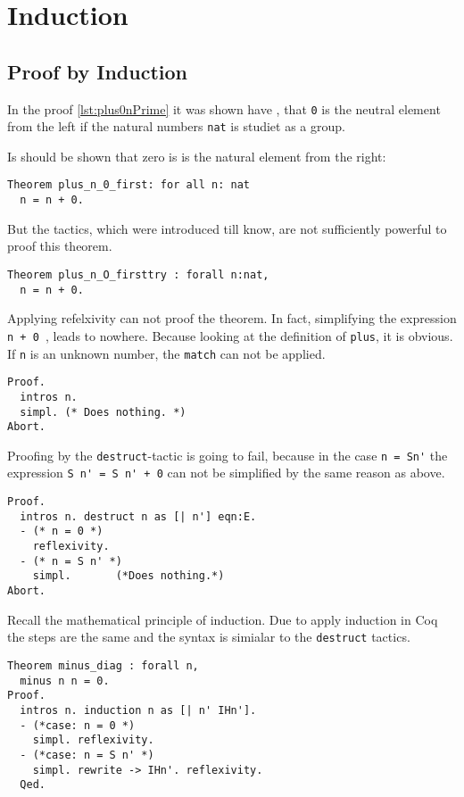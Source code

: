 \section{Induction}

\subsection{Proof by Induction}
In the proof \ref{lst:plus0nPrime} it was shown have , 
that \lstinline!0! is the neutral element from the left if the natural numbers \lstinline!nat! is studiet as a group. 

Is should be shown that zero is is the natural element from the right:
\begin{lstlisting}
Theorem plus_n_0_first: for all n: nat
  n = n + 0.  
\end{lstlisting}

But the tactics, which were introduced till know, are not sufficiently powerful to proof this theorem.

\begin{lstlisting}
Theorem plus_n_O_firsttry : forall n:nat,
  n = n + 0.
\end{lstlisting}

Applying refelxivity can not proof the theorem. In fact, simplifying the expression \lstinline!n + 0 !, leads to nowhere.
Because looking at the definition of \lstinline!plus!, it is obvious.
If \lstinline!n! is an unknown number, the  \lstinline!match! can not be applied.
  
\begin{lstlisting}
Proof.
  intros n.
  simpl. (* Does nothing. *)
Abort.
\end{lstlisting}

Proofing by the \lstinline!destruct!-tactic is going to fail, because in the case \lstinline!n = Sn'! the expression \lstinline!S n' = S n' + 0! can not be simplified by the same reason as above.
\begin{lstlisting}
Proof.
  intros n. destruct n as [| n'] eqn:E.
  - (* n = 0 *)
    reflexivity. 
  - (* n = S n' *)
    simpl.       (*Does nothing.*)
Abort.
\end{lstlisting}

Recall the mathematical principle of induction.
Due to apply induction in Coq the steps are the same and the syntax is simialar to the \lstinline!destruct! tactics.
 

\begin{lstlisting}
Theorem minus_diag : forall n,
  minus n n = 0.
Proof.
  intros n. induction n as [| n' IHn'].
  - (*case: n = 0 *)
    simpl. reflexivity.
  - (*case: n = S n' *)
    simpl. rewrite -> IHn'. reflexivity.  
  Qed.
\end{lstlisting}

